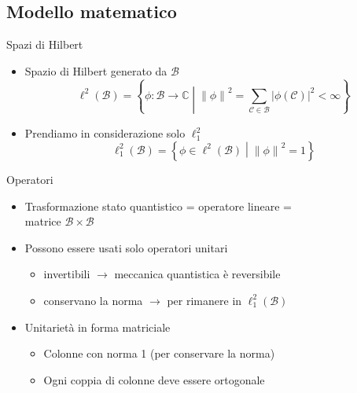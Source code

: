 \documentclass{beamer}
\newcommand{\spacedmiddle}[1]{\mathrel{}\middle#1\mathrel{}}
\newcommand{\hil}{\ell^{2}}
\newcommand{\hiluninorm}{\hil_{1}}
\begin{document}
\subsection{Modello matematico}

\begin{frame}{\subsecname}{Spazi di Hilbert}
	\begin{itemize}
		\item<+-> \alert{Spazio di Hilbert} generato da \( \mathcal{B} \)
		\[ \hil \left ( \mathcal{B} \right ) = \left \{ \phi : \mathcal{B} \rightarrow \mathbb{C} \spacedmiddle | \left \| \phi \right \|^{2} = \sum_{\mathcal{C} \in \mathcal{B}} \left | \phi \left ( \mathcal{C} \right ) \right |^{2} < \infty \right \}\]
		\item<+-> Prendiamo in considerazione solo \(\hiluninorm\)
		\[ \hiluninorm \left ( \mathcal{B} \right ) = \left \{ \phi \in \hil \left ( \mathcal{B} \right ) \spacedmiddle | \left \| \phi \right \|^{2} = 1 \right \}\]
	\end{itemize}
\end{frame}

\begin{frame}{\subsecname}{Operatori}
	\begin{itemize}
		\item<+-> Trasformazione stato quantistico = operatore lineare = \\
		matrice \( \mathcal{B} \times \mathcal{B} \)
		\item<+-> Possono essere usati solo \alert{operatori unitari}
		\begin{itemize}
			\item invertibili \(\rightarrow\) meccanica quantistica è reversibile
			\item conservano la norma \(\rightarrow\) per rimanere in \(\hiluninorm \left ( \mathcal{B} \right )\)
		\end{itemize}
		\item<+-> Unitarietà in forma matriciale
		\begin{itemize}
			\item Colonne con norma 1 (per conservare la norma)
			\item Ogni coppia di colonne deve essere ortogonale
		\end{itemize}
	\end{itemize}
\end{frame}
\end{document}
